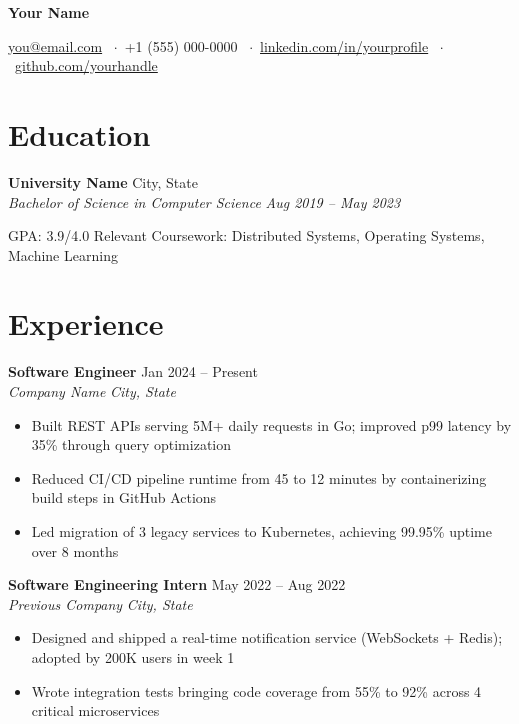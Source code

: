 \documentclass[10pt, letterpaper]{article}
\newcommand{\resumeEntry}[4]{%
  \textbf{#1} \hfill #2 \\
  \textit{#3} \hfill \textit{#4}
}
\begin{document}
\begin{center}
  {\LARGE \textbf{Your Name}}

  \vspace{3pt}
  \href{mailto:you@email.com}{you@email.com}
  \ $\cdot$\ +1 (555) 000-0000
  \ $\cdot$\ \href{https://linkedin.com/in/yourprofile}{linkedin.com/in/yourprofile}
  \ $\cdot$\ \href{https://github.com/yourhandle}{github.com/yourhandle}
\end{center}

\section{Education}

\resumeEntry{University Name}{City, State}{Bachelor of Science in Computer Science}{Aug 2019 -- May 2023}

\vspace{2pt}
GPA: 3.9/4.0 \quad Relevant Coursework: Distributed Systems, Operating Systems, Machine Learning

\section{Experience}

\resumeEntry{Software Engineer}{Jan 2024 -- Present}{Company Name}{City, State}
\begin{itemize}[leftmargin=*, noitemsep, topsep=3pt, parsep=0pt]
  \item Built REST APIs serving 5M+ daily requests in Go; improved p99 latency by 35\% through query optimization
  \item Reduced CI/CD pipeline runtime from 45 to 12 minutes by containerizing build steps in GitHub Actions
  \item Led migration of 3 legacy services to Kubernetes, achieving 99.95\% uptime over 8 months
\end{itemize}

\vspace{4pt}
\resumeEntry{Software Engineering Intern}{May 2022 -- Aug 2022}{Previous Company}{City, State}
\begin{itemize}[leftmargin=*, noitemsep, topsep=3pt, parsep=0pt]
  \item Designed and shipped a real-time notification service (WebSockets + Redis); adopted by 200K users in week 1
  \item Wrote integration tests bringing code coverage from 55\% to 92\% across 4 critical microservices
\end{itemize}
\end{document}
